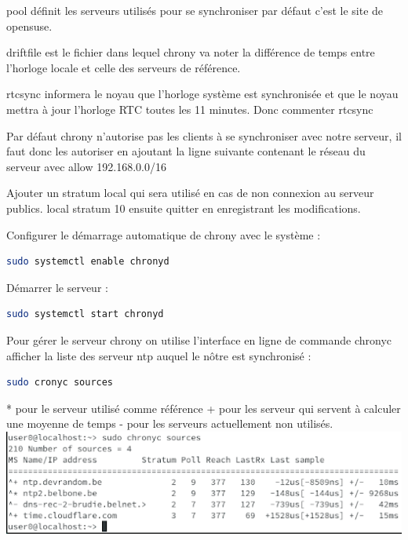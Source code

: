 \documentclass[a4paper]{article}
\begin{document}
\begin{adjustwidth}{-2cm}{-2cm}
pool définit les serveurs utilisés pour se synchroniser par défaut c’est le site de opensuse. \newline

driftfile est le fichier dans lequel chrony va noter la différence de temps entre l’horloge locale et celle des serveurs de référence. \newline

rtcsync informera le noyau que l'horloge système est synchronisée et que le noyau mettra à jour l'horloge RTC toutes les 11 minutes. Donc commenter rtcsync

Par défaut chrony n’autorise pas les clients à se synchroniser avec notre serveur, il faut donc les autoriser en ajoutant la ligne suivante contenant le réseau du serveur avec
allow 192.168.0.0/16\newline

Ajouter un stratum local qui sera utilisé en cas de non connexion au serveur publics. \newline
local stratum 10 \newline
ensuite quitter en enregistrant les modifications.

\noindent Configurer le démarrage automatique de chrony avec le système :
\begin{lstlisting}[language=bash]
sudo systemctl enable chronyd
\end{lstlisting}

\noindent Démarrer le serveur :
\begin{lstlisting}[language=bash]
sudo systemctl start chronyd
\end{lstlisting}

Pour gérer le serveur chrony on utilise l’interface en ligne de commande chronyc\newline
\noindent afficher la liste des serveur ntp auquel le nôtre est synchronisé :
\begin{lstlisting}[language=bash]
sudo cronyc sources
\end{lstlisting}
* pour le serveur utilisé comme référence\newline
+ pour les serveur qui servent à calculer une moyenne de temps\newline
- pour les serveurs actuellement non utilisés.\newline \newline
\includegraphics[scale=0.7]{picture/7.png} \newline


\end{adjustwidth}
\end{document}
